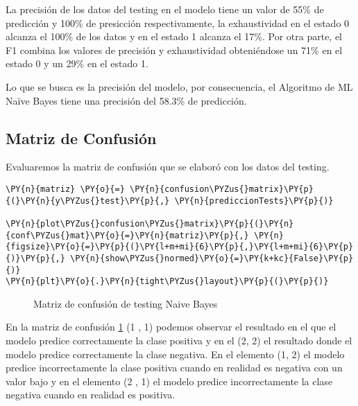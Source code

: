     La precisión de los datos del testing en el modelo tiene un valor de 55\% de predicción y 100\% de presicción respectivamente, la exhaustividad en el estado 0 alcanza el 100\% de los datos y en el estado 1 alcanza el 17\%.  Por otra parte, el F1 combina los valores de precisión y exhaustividad obteniéndose un 71\% en el estado 0 y un 29\% en el estado 1. 

Lo que se busca es la precisión del modelo, por consecuencia, el Algoritmo de ML Naïve Bayes tiene una precisión del 58.3\% de predicción.

    \hypertarget{matriz-de-confusiuxf3n}{%
\subsection{Matriz de Confusión}\label{matriz-de-confusiuxf3n}}

Evaluaremos la matriz de confusión que se elaboró con los datos del
testing.

    \begin{tcolorbox}[breakable, size=fbox, boxrule=1pt, pad at break*=1mm,colback=cellbackground, colframe=cellborder]
\begin{Verbatim}[commandchars=\\\{\}]
\PY{n}{matriz} \PY{o}{=} \PY{n}{confusion\PYZus{}matrix}\PY{p}{(}\PY{n}{y\PYZus{}test}\PY{p}{,} \PY{n}{prediccionTests}\PY{p}{)}

\PY{n}{plot\PYZus{}confusion\PYZus{}matrix}\PY{p}{(}\PY{n}{conf\PYZus{}mat}\PY{o}{=}\PY{n}{matriz}\PY{p}{,} \PY{n}{figsize}\PY{o}{=}\PY{p}{(}\PY{l+m+mi}{6}\PY{p}{,}\PY{l+m+mi}{6}\PY{p}{)}\PY{p}{,} \PY{n}{show\PYZus{}normed}\PY{o}{=}\PY{k+kc}{False}\PY{p}{)}
\PY{n}{plt}\PY{o}{.}\PY{n}{tight\PYZus{}layout}\PY{p}{(}\PY{p}{)}
\end{Verbatim}
\end{tcolorbox}

\begin{center}
    	\begin{figure}[H]
	\centering
	\caption{Matriz de confusión de testing Naive Bayes}
	\label{fig:mctnb}
	\end{figure}
\end{center}
    
    En la matriz de confusión \ref{fig:mctnb} (1 , 1) podemos observar el resultado en el
que el modelo predice correctamente la clase positiva y en el (2, 2) el
resultado donde el modelo predice correctamente la clase negativa. En el
elemento (1, 2) el modelo predice incorrectamente la clase positiva
cuando en realidad es negativa con un valor bajo y en el elemento (2 ,
1) el modelo predice incorrectamente la clase negativa cuando en
realidad es positiva.

